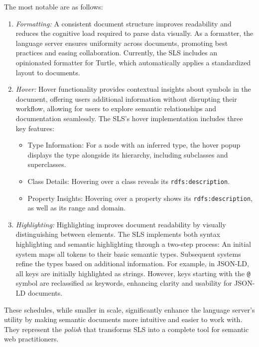 The most notable are as follows:
\begin{enumerate}
  \item \textit{Formatting:}
    A consistent document structure improves readability and reduces the cognitive load required to parse data visually.
    As a formatter, the language server ensures uniformity across documents, promoting best practices and easing collaboration.
    Currently, the SLS includes an opinionated formatter for Turtle, which automatically applies a standardized layout to documents.

  \item \textit{Hover:}
    Hover functionality provides contextual insights about symbols in the document, offering users additional information without disrupting their workflow,
    allowing for users to explore semantic relationships and documentation seamlessly.
    The SLS’s hover implementation includes three key features:
    \begin{itemize}
      \item Type Information: For a node with an inferred type, the hover popup displays the type alongside its hierarchy, including subclasses and superclasses.
      \item Class Details: Hovering over a class reveals its \texttt{rdfs:description}.
      \item Property Insights: Hovering over a property shows its \texttt{rdfs:description}, as well as its range and domain.
    \end{itemize}

  \item \textit{Highlighting:}
    Highlighting improves document readability by visually distinguishing between elements.
    The SLS implements both syntax highlighting and semantic highlighting through a two-step process:
        An initial system maps all tokens to their basic semantic types.
        Subsequent systems refine the types based on additional information.
    For example, in JSON-LD, all keys are initially highlighted as strings.
    However, keys starting with the \texttt{@} symbol are reclassified as keywords, enhancing clarity and usability for JSON-LD documents.
\end{enumerate}

These schedules, while smaller in scale, significantly enhance the language server’s utility by making semantic documents more intuitive and easier to work with.
They represent the \textit{polish} that transforms SLS into a complete tool for semantic web practitioners.


